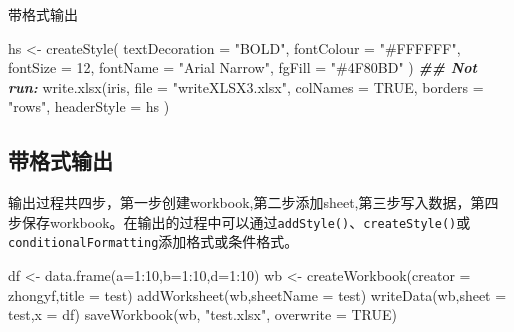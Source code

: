 \documentclass[
]{book}
\newenvironment{Shaded}{\begin{snugshade}}{\end{snugshade}}
\newcommand{\AttributeTok}[1]{\textcolor[rgb]{0.77,0.63,0.00}{#1}}
\newcommand{\ConstantTok}[1]{\textcolor[rgb]{0.00,0.00,0.00}{#1}}
\newcommand{\DecValTok}[1]{\textcolor[rgb]{0.00,0.00,0.81}{#1}}
\newcommand{\DocumentationTok}[1]{\textcolor[rgb]{0.56,0.35,0.01}{\textbf{\textit{#1}}}}
\newcommand{\FunctionTok}[1]{\textcolor[rgb]{0.00,0.00,0.00}{#1}}
\newcommand{\NormalTok}[1]{#1}
\newcommand{\OtherTok}[1]{\textcolor[rgb]{0.56,0.35,0.01}{#1}}
\newcommand{\SpecialCharTok}[1]{\textcolor[rgb]{0.00,0.00,0.00}{#1}}
\newcommand{\StringTok}[1]{\textcolor[rgb]{0.31,0.60,0.02}{#1}}
\begin{document}
带格式输出

\begin{Shaded}
\begin{Highlighting}[]
\NormalTok{hs }\OtherTok{\textless{}{-}} \FunctionTok{createStyle}\NormalTok{(}
  \AttributeTok{textDecoration =} \StringTok{"BOLD"}\NormalTok{, }\AttributeTok{fontColour =} \StringTok{"\#FFFFFF"}\NormalTok{, }\AttributeTok{fontSize =} \DecValTok{12}\NormalTok{,}
  \AttributeTok{fontName =} \StringTok{"Arial Narrow"}\NormalTok{, }\AttributeTok{fgFill =} \StringTok{"\#4F80BD"}
\NormalTok{)}
\DocumentationTok{\#\# Not run: }
\FunctionTok{write.xlsx}\NormalTok{(iris,}
  \AttributeTok{file =} \StringTok{"writeXLSX3.xlsx"}\NormalTok{,}
  \AttributeTok{colNames =} \ConstantTok{TRUE}\NormalTok{, }\AttributeTok{borders =} \StringTok{"rows"}\NormalTok{, }\AttributeTok{headerStyle =}\NormalTok{ hs}
\NormalTok{)}
\end{Highlighting}
\end{Shaded}

\hypertarget{ux5e26ux683cux5f0fux8f93ux51fa}{%
\subsection{带格式输出}\label{ux5e26ux683cux5f0fux8f93ux51fa}}

输出过程共四步，第一步创建workbook,第二步添加sheet,第三步写入数据，第四步保存workbook。在输出的过程中可以通过\texttt{addStyle()}、\texttt{createStyle()}或\texttt{conditionalFormatting}添加格式或条件格式。

\begin{Shaded}
\begin{Highlighting}[]
\NormalTok{df }\OtherTok{\textless{}{-}} \FunctionTok{data.frame}\NormalTok{(}\AttributeTok{a=}\DecValTok{1}\SpecialCharTok{:}\DecValTok{10}\NormalTok{,}\AttributeTok{b=}\DecValTok{1}\SpecialCharTok{:}\DecValTok{10}\NormalTok{,}\AttributeTok{d=}\DecValTok{1}\SpecialCharTok{:}\DecValTok{10}\NormalTok{)}
\NormalTok{wb }\OtherTok{\textless{}{-}} \FunctionTok{createWorkbook}\NormalTok{(}\AttributeTok{creator =} \StringTok{\textquotesingle{}zhongyf\textquotesingle{}}\NormalTok{,}\AttributeTok{title =} \StringTok{\textquotesingle{}test\textquotesingle{}}\NormalTok{)}
\FunctionTok{addWorksheet}\NormalTok{(wb,}\AttributeTok{sheetName =} \StringTok{\textquotesingle{}test\textquotesingle{}}\NormalTok{)}
\FunctionTok{writeData}\NormalTok{(wb,}\AttributeTok{sheet =} \StringTok{\textquotesingle{}test\textquotesingle{}}\NormalTok{,}\AttributeTok{x =}\NormalTok{ df)}
\FunctionTok{saveWorkbook}\NormalTok{(wb, }\StringTok{"test.xlsx"}\NormalTok{, }\AttributeTok{overwrite =} \ConstantTok{TRUE}\NormalTok{)}
\end{Highlighting}
\end{Shaded}
\end{document}
